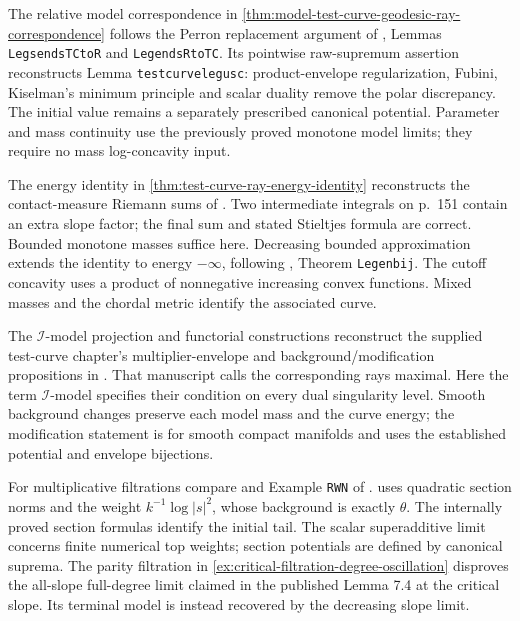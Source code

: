 The relative model correspondence in \cref{thm:model-test-curve-geodesic-ray-correspondence} follows the Perron replacement argument of \cite{XiaSampleBook}, Lemmas \texttt{LegsendsTCtoR} and \texttt{LegendsRtoTC}. Its pointwise raw-supremum assertion reconstructs Lemma \texttt{testcurvelegusc}: product-envelope regularization, Fubini, Kiselman's minimum principle and scalar duality remove the polar discrepancy. The initial value remains a separately prescribed canonical potential. Parameter and mass continuity use the previously proved monotone model limits; they require no mass log-concavity input.

The energy identity in \cref{thm:test-curve-ray-energy-identity} reconstructs the contact-measure Riemann sums of \cite[Proposition 6.7, pp.~150--151]{RWN14}. Two intermediate integrals on p.~151 contain an extra slope factor; the final sum and stated Stieltjes formula are correct. Bounded monotone masses suffice here. Decreasing bounded approximation extends the identity to energy $-\infty$, following \cite{XiaSampleBook}, Theorem \texttt{Legenbij}. The cutoff concavity uses a product of nonnegative increasing convex functions. Mixed masses and the chordal metric identify the associated curve.

The $\mathcal I$-model projection and functorial constructions reconstruct the supplied test-curve chapter's multiplier-envelope and background/modification propositions in \cite{XiaSampleBook}. That manuscript calls the corresponding rays maximal. Here the term $\mathcal I$-model specifies their condition on every dual singularity level. Smooth background changes preserve each model mass and the curve energy; the modification statement is for smooth compact manifolds and uses the established potential and envelope bijections.

For multiplicative filtrations compare \cite[Definitions 7.1--7.2, p.~153; Lemma 7.4, pp.~154--156]{RWN14} and Example \texttt{RWN} of \cite{XiaSampleBook}.  uses quadratic section norms and the weight $k^{-1}\log|s|^2$, whose background is exactly $\theta$. The internally proved section formulas identify the initial tail. The scalar superadditive limit concerns finite numerical top weights; section potentials are defined by canonical suprema. The parity filtration in \cref{ex:critical-filtration-degree-oscillation} disproves the all-slope full-degree limit claimed in the published Lemma 7.4 at the critical slope. Its terminal model is instead recovered by the decreasing slope limit.

